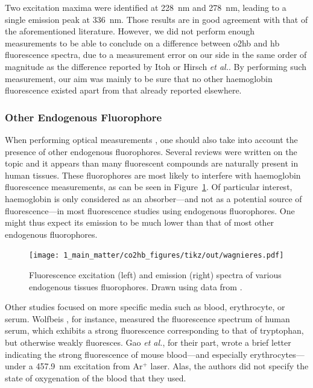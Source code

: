 Two excitation maxima were identified at 228~nm and 278~nm, leading to a single emission peak at 336~nm. Those results are in good agreement with that of the aforementioned literature\cite{hirsch1980, alpert1980}. However, we did not perform enough measurements to be able to conclude on a difference between \gls{o2hb} and \gls{hb} fluorescence spectra, due to a measurement error on our side in the same order of magnitude as the difference reported by Itoh \etal{}\cite{itoh1981} or Hirsch \textit{et al.}\cite{hirsch1981}. By performing such measurement, our aim was mainly to be sure that no other haemoglobin fluorescence existed apart from that already reported elsewhere.

\subsubsection{Other Endogenous Fluorophore}

When performing optical measurements \invivo{}, one should also take into account the presence of other endogenous fluorophores. Several reviews were written on the topic\cite{wagnieres1998, vishwanath2011} and it appears than many fluorescent compounds are naturally present in human tissues. These fluorophores are most likely to interfere with haemoglobin fluorescence measurements, as can be seen in Figure~\ref{fig:co2hb:wagnieres_fig}. Of particular interest, haemoglobin is only considered as an absorber---and not as a potential source of fluorescence---in most fluorescence studies using endogenous fluorophores. One might thus expect its emission to be much lower than that of most other endogenous fluorophores\cite{kollias2002}.

\begin{figure}
	\centering
	\texttt{[image: 1\_main\_matter/co2hb\_figures/tikz/out/wagnieres.pdf]}
	\caption[Fluorescence excitation and emission spectra of various endogenous tissues fluorophores.]{Fluorescence excitation (left) and emission (right) spectra of various endogenous tissues fluorophores. Drawn using data from \cite{wagnieres1998}.}
	\label{fig:co2hb:wagnieres_fig}
\end{figure}

Other studies focused on more specific media such as blood, erythrocyte, or serum. Wolfbeis \etal{}, for instance, measured the fluorescence spectrum of human serum, which exhibits a strong fluorescence corresponding to that of tryptophan, but otherwise weakly fluoresces\cite{wolfbeis1985}. Gao \textit{et al.}\cite{gao2004}, for their part, wrote a brief letter indicating the strong fluorescence of mouse blood---and especially erythrocytes---under a 457.9~nm excitation from Ar$^+$ laser. Alas, the authors did not specify the state of oxygenation of the blood that they used.

